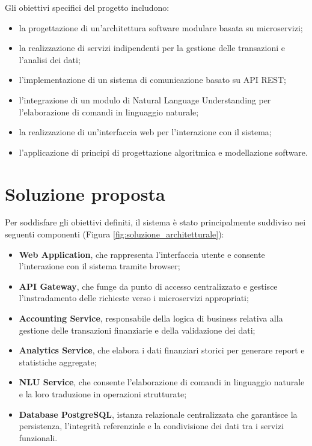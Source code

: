 Gli obiettivi specifici del progetto includono:
\begin{itemize}
    \item la progettazione di un’architettura software modulare basata su microservizi;
    \item la realizzazione di servizi indipendenti per la gestione delle transazioni e l’analisi dei dati;
    \item l’implementazione di un sistema di comunicazione basato su API REST;
    \item l’integrazione di un modulo di Natural Language Understanding per l’elaborazione di comandi in linguaggio naturale;
    \item la realizzazione di un’interfaccia web per l’interazione con il sistema;
    \item l’applicazione di principi di progettazione algoritmica e modellazione software.
\end{itemize}

\section{Soluzione proposta}

Per soddisfare gli obiettivi definiti, il sistema è stato principalmente suddiviso nei seguenti componenti (Figura \ref{fig:soluzione_architetturale}):
\begin{itemize}
    \item \textbf{Web Application}, che rappresenta l’interfaccia utente e consente l’interazione con il sistema tramite browser;
    \item \textbf{API Gateway}, che funge da punto di accesso centralizzato e gestisce l’instradamento delle richieste verso i microservizi appropriati;
    \item \textbf{Accounting Service}, responsabile della logica di business relativa alla gestione delle transazioni finanziarie e della validazione dei dati;
    \item \textbf{Analytics Service}, che elabora i dati finanziari storici per generare report e statistiche aggregate;
    \item \textbf{NLU Service}, che consente l’elaborazione di comandi in linguaggio naturale e la loro traduzione in operazioni strutturate;
    \item \textbf{Database PostgreSQL}, istanza relazionale centralizzata che garantisce la persistenza, l’integrità referenziale e la condivisione dei dati tra i servizi funzionali.
\end{itemize}

